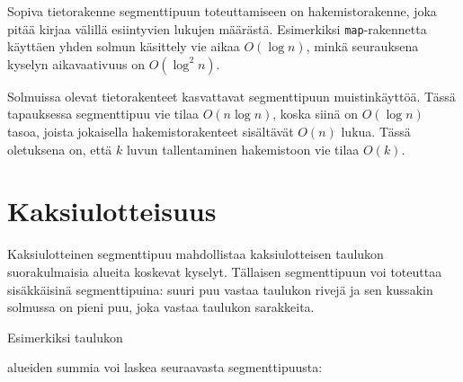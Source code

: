 Sopiva tietorakenne segmenttipuun toteuttamiseen on
hakemistorakenne, joka pitää kirjaa välillä esiintyvien
lukujen määrästä.
Esimerkiksi \texttt{map}-ra\-ken\-net\-ta käyttäen
yhden solmun käsittely vie aikaa $O(\log n)$,
minkä seurauksena kyselyn aikavaativuus on $O(\log^2 n)$.

Solmuissa olevat tietorakenteet kasvattavat
segmenttipuun muistinkäyttöä.
Tässä tapauksessa
segmenttipuu vie tilaa $O(n \log n)$,
koska siinä on $O(\log n)$ tasoa, joista
jokaisella hakemistorakenteet sisältävät $O(n)$ lukua.
Tässä oletuksena on, että $k$ luvun tallentaminen
hakemistoon vie tilaa $O(k)$.

\section{Kaksiulotteisuus}


Kaksiulotteinen segmenttipuu mahdollistaa
kaksiulotteisen taulukon
suorakulmaisia alueita koskevat kyselyt.
Tällaisen segmenttipuun voi toteuttaa
sisäkkäisinä segmenttipuina:
suuri puu vastaa taulukon rivejä
ja sen kussakin solmussa on pieni puu,
joka vastaa taulukon sarakkeita.

Esimerkiksi taulukon
\begin{center}
\end{center}

alueiden summia voi laskea seuraavasta segmenttipuusta:

